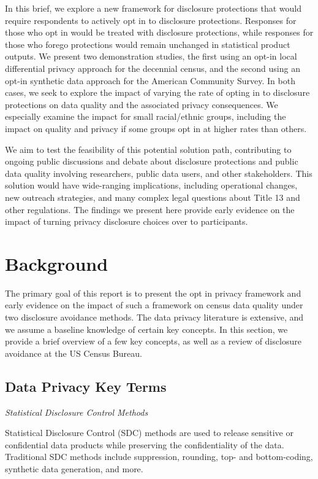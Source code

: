 \documentclass[
]{urban-formatting}
\begin{document}
In this brief, we explore a new framework for disclosure protections
that would require respondents to actively opt in to disclosure
protections. Responses for those who opt in would be treated with
disclosure protections, while responses for those who forego protections
would remain unchanged in statistical product outputs. We present two
demonstration studies, the first using an opt-in local differential
privacy approach for the decennial census, and the second using an
opt-in synthetic data approach for the American Community Survey. In
both cases, we seek to explore the impact of varying the rate of opting
in to disclosure protections on data quality and the associated privacy
consequences. We especially examine the impact for small racial/ethnic
groups, including the impact on quality and privacy if some groups opt
in at higher rates than others.

We aim to test the feasibility of this potential solution path,
contributing to ongoing public discussions and debate about disclosure
protections and public data quality involving researchers, public data
users, and other stakeholders. This solution would have wide-ranging
implications, including operational changes, new outreach strategies,
and many complex legal questions about Title 13 and other regulations.
The findings we present here provide early evidence on the impact of
turning privacy disclosure choices over to participants.

\section{Background}

The primary goal of this report is to present the opt in privacy
framework and early evidence on the impact of such a framework on census
data quality under two disclosure avoidance methods. The data privacy
literature is extensive, and we assume a baseline knowledge of certain
key concepts. In this section, we provide a brief overview of a few key
concepts, as well as a review of disclosure avoidance at the US Census
Bureau.

\subsection{Data Privacy Key Terms}

\emph{Statistical Disclosure Control Methods}

Statistical Disclosure Control (SDC) methods are used to release
sensitive or confidential data products while preserving the
confidentiality of the data. Traditional SDC methods include
suppression, rounding, top- and bottom-coding, synthetic data
generation, and more.
\end{document}
